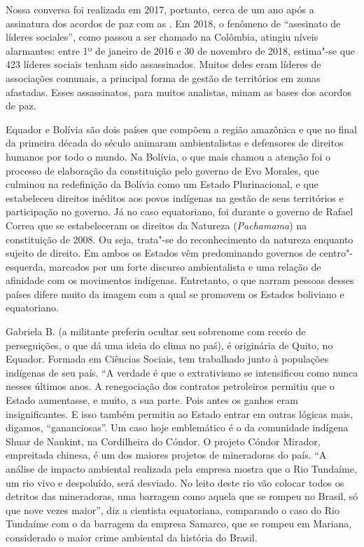 Nossa conversa foi realizada em 2017, portanto, cerca de um ano após a
assinatura dos acordos de paz com as . Em 2018, o fenômeno de
``asesinato de líderes sociales'', como passou a ser chamado na
Colômbia, atingiu níveis alarmantes: entre 1º de
janeiro de 2016 e 30 de novembro de 2018, estima"-se que 423 líderes
sociais tenham sido assassinados. Muitos deles eram líderes de
associações comunais, a principal forma de gestão de territórios em
zonas afastadas. Esses assassinatos, para muitos analistas, minam as
bases dos acordos de paz.

Equador e Bolívia são dois países que compõem a região amazônica e que
no final da primeira década do século  animaram ambientalistas e
defensores de direitos humanos por todo o mundo. Na Bolívia, o que mais
chamou a atenção foi o processo de elaboração da constituição pelo
governo de Evo Morales, que culminou na redefinição da Bolívia como um
Estado Plurinacional, e que estabeleceu direitos inéditos aos povos
indígenas na gestão de seus territórios e participação no governo. Já no
caso equatoriano, foi durante o governo de Rafael Correa que se
estabeleceram os direitos da Natureza (\emph{Pachamama}) na constituição
de 2008. Ou seja, trata"-se do reconhecimento da natureza enquanto
sujeito de direito. Em ambos os Estados vêm predominando governos de
centro"-esquerda, marcados por um forte discurso ambientalista e uma
relação de afinidade com os movimentos indígenas. Entretanto, o que
narram pessoas desses países difere muito da imagem com a qual se
promovem os Estados boliviano e equatoriano.

Gabriela B. (a militante preferiu ocultar seu sobrenome com receio de
perseguições, o que dá uma ideia do clima no paś), é originária de
Quito, no Equador. Formada em Ciências Sociais, tem trabalhado junto à
populações indígenas de seu país. ``A verdade é que o extrativismo se
intensificou como nunca nesses últimos anos. A renegociação dos
contratos petroleiros permitiu que o Estado aumentasse, e muito, a sua
parte. Pois antes os ganhos eram insignificantes. E isso também permitiu
ao Estado entrar em outras lógicas mais, digamos, ``gananciosas''. Um
caso hoje emblemático é o da comunidade indígena Shuar de Nankint, na
Cordilheira do Cóndor. O projeto Cóndor Mirador, empreitada chinesa, é
um dos maiores projetos de mineradoras do país. ``A análise de impacto
ambiental realizada pela empresa mostra que o Rio Tundaíme, um rio vivo
e despoluído, será desviado. No leito deste rio vão colocar todos os
detritos das mineradoras, uma barragem como aquela que se rompeu no
Brasil, só que nove vezes maior'', diz a cientista equatoriana,
comparando o caso do Rio Tundaíme com o da barragem da empresa Samarco,
que se rompeu em Mariana, considerado o maior crime ambiental da
história do Brasil.

